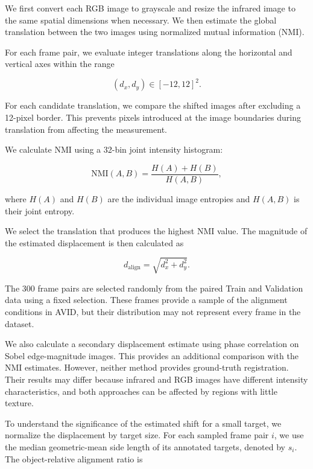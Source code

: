 \documentclass[10pt]{article}
\newcommand{\dataset}{\textsc{AVID}}
\begin{document}
We first convert each RGB image to grayscale and resize the infrared image to the same spatial dimensions when necessary. We then estimate the global translation between the two images using normalized mutual information (NMI).

For each frame pair, we evaluate integer translations along the horizontal and vertical axes within the range

\begin{equation}
(d_x,d_y)\in[-12,12]^2.
\end{equation}

For each candidate translation, we compare the shifted images after excluding a 12-pixel border. This prevents pixels introduced at the image boundaries during translation from affecting the measurement.

We calculate NMI using a 32-bin joint intensity histogram:

\begin{equation}
\mathrm{NMI}(A,B)
=
\frac{H(A)+H(B)}
{H(A,B)},
\end{equation}

where $H(A)$ and $H(B)$ are the individual image entropies and $H(A,B)$ is their joint entropy.

We select the translation that produces the highest NMI value. The magnitude of the estimated displacement is then calculated as

\begin{equation}
d_{\mathrm{align}}
=
\sqrt{d_x^2+d_y^2}.
\end{equation}

The 300 frame pairs are selected randomly from the paired Train and Validation data using a fixed selection. These frames provide a sample of the alignment conditions in \dataset{}, but their distribution may not represent every frame in the dataset.

We also calculate a secondary displacement estimate using phase correlation on Sobel edge-magnitude images. This provides an additional comparison with the NMI estimates. However, neither method provides ground-truth registration. Their results may differ because infrared and RGB images have different intensity characteristics, and both approaches can be affected by regions with little texture.

To understand the significance of the estimated shift for a small target, we normalize the displacement by target size. For each sampled frame pair $i$, we use the median geometric-mean side length of its annotated targets, denoted by $s_i$. The object-relative alignment ratio is
\end{document}
